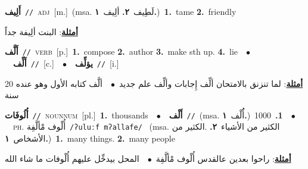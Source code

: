 \documentclass[10pt,a4paper,twoside]{article} %
\begin{document}
\begin{multicols}{2}
{\setlength\topsep{0pt}\textbf{\foreignlanguage{arabic}{أَلِيف}}\ {\color{gray}\texttt{//}\color{black}}\ \textsc{adj}\ [m.]\ \color{gray}(msa. \foreignlanguage{arabic}{لَطِيف}~\foreignlanguage{arabic}{\textbf{٢.}}  \foreignlanguage{arabic}{ألِيف}~\foreignlanguage{arabic}{\textbf{١.}})\color{black}\ \textbf{1.}~tame  \textbf{2.}~friendly\  \begin{flushright}\color{gray}\foreignlanguage{arabic}{\textbf{\underline{\foreignlanguage{arabic}{أمثلة}}}: البنت ألِيفة جداً}\end{flushright}\color{black}} \vspace{2mm}

{\setlength\topsep{0pt}\textbf{\foreignlanguage{arabic}{أَلَّف}}\ {\color{gray}\texttt{//}\color{black}}\ \textsc{verb}\ [p.]\ \textbf{1.}~compose  \textbf{2.}~author  \textbf{3.}~make sth up.  \textbf{4.}~lie\ \ $\bullet$\ \ \setlength\topsep{0pt}\textbf{\foreignlanguage{arabic}{أَلِّف}}\ {\color{gray}\texttt{//}\color{black}}\ [c.]\ \ $\bullet$\ \ \setlength\topsep{0pt}\textbf{\foreignlanguage{arabic}{يؤلِّف}}\ {\color{gray}\texttt{//}\color{black}}\ [i.]\  \begin{flushright}\color{gray}\foreignlanguage{arabic}{\textbf{\underline{\foreignlanguage{arabic}{أمثلة}}}: لما تنزنق بالامتحان ألِّف إِجابات وألِّف علم جديد\ $\bullet$\ \  ألَّف كتابه الأول وهو عنده 20 سنة}\end{flushright}\color{black}} \vspace{2mm}

{\setlength\topsep{0pt}\textbf{\foreignlanguage{arabic}{أُلُوفَات}}\ {\color{gray}\texttt{//}\color{black}}\ \textsc{noun\textunderscore num}\ [pl.]\ \textbf{1.}~thousands\ \ $\bullet$\ \ \setlength\topsep{0pt}\textbf{\foreignlanguage{arabic}{أَلْف}}\ {\color{gray}\texttt{//}\color{black}}\ \color{gray}(msa. \foreignlanguage{arabic}{أَُلْف}~\foreignlanguage{arabic}{\textbf{١.}})\color{black}\ \textbf{1.}~1000\ \ $\bullet$\ \ \textsc{ph.} \color{gray} \foreignlanguage{arabic}{أُلْوف مْألَّفِة}\color{black}\ {\color{gray}\texttt{/{\sffamily ʔuluːf mʔallafe}/}\color{black}}\ \color{gray} (msa. \foreignlanguage{arabic}{الكثير من الأشياء}~\foreignlanguage{arabic}{\textbf{٢.}}  .\foreignlanguage{arabic}{الكثير من الأشخاص}~\foreignlanguage{arabic}{\textbf{١.}})\color{black}\ \textbf{1.}~many things.  \textbf{2.}~many people\  \begin{flushright}\color{gray}\foreignlanguage{arabic}{\textbf{\underline{\foreignlanguage{arabic}{أمثلة}}}: راحوا بعدين عالقدس أُلْوف مْألَّفِة\ $\bullet$\ \  المحل بيدخِّل عليهم أُلْوفات ما شاء الله}\end{flushright}\color{black}} \vspace{2mm}


\end{multicols}
\end{document}
